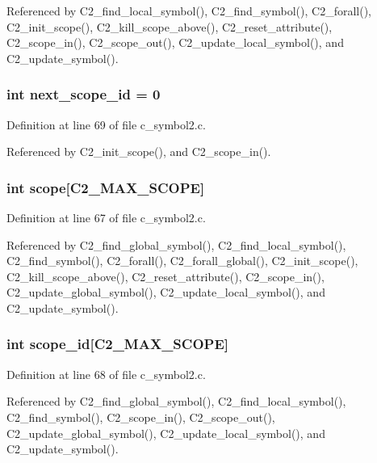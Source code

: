 Referenced by C2\_\-find\_\-local\_\-symbol(), C2\_\-find\_\-symbol(), C2\_\-forall(), C2\_\-init\_\-scope(), C2\_\-kill\_\-scope\_\-above(), C2\_\-reset\_\-attribute(), C2\_\-scope\_\-in(), C2\_\-scope\_\-out(), C2\_\-update\_\-local\_\-symbol(), and C2\_\-update\_\-symbol().
\subsubsection{\setlength{\rightskip}{0pt plus 5cm}int \bf{next\_\-scope\_\-id} = 0\hspace{0.3cm}{\tt  [static]}}\label{c__symbol2_8c_b8b9942ac14fade12af4496cde4ebe00}




Definition at line 69 of file c\_\-symbol2.c.

Referenced by C2\_\-init\_\-scope(), and C2\_\-scope\_\-in().
\subsubsection{\setlength{\rightskip}{0pt plus 5cm}int \bf{scope}[C2\_\-MAX\_\-SCOPE]\hspace{0.3cm}{\tt  [static]}}\label{c__symbol2_8c_3481e1c10d0d47936593954404d43636}




Definition at line 67 of file c\_\-symbol2.c.

Referenced by C2\_\-find\_\-global\_\-symbol(), C2\_\-find\_\-local\_\-symbol(), C2\_\-find\_\-symbol(), C2\_\-forall(), C2\_\-forall\_\-global(), C2\_\-init\_\-scope(), C2\_\-kill\_\-scope\_\-above(), C2\_\-reset\_\-attribute(), C2\_\-scope\_\-in(), C2\_\-update\_\-global\_\-symbol(), C2\_\-update\_\-local\_\-symbol(), and C2\_\-update\_\-symbol().
\subsubsection{\setlength{\rightskip}{0pt plus 5cm}int \bf{scope\_\-id}[C2\_\-MAX\_\-SCOPE]\hspace{0.3cm}{\tt  [static]}}\label{c__symbol2_8c_470a23d1004bafd327db72af53a1ca74}




Definition at line 68 of file c\_\-symbol2.c.

Referenced by C2\_\-find\_\-global\_\-symbol(), C2\_\-find\_\-local\_\-symbol(), C2\_\-find\_\-symbol(), C2\_\-scope\_\-in(), C2\_\-scope\_\-out(), C2\_\-update\_\-global\_\-symbol(), C2\_\-update\_\-local\_\-symbol(), and C2\_\-update\_\-symbol().